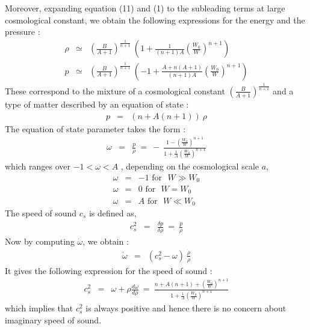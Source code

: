 \documentclass[a4paper,12pt,a4]{article}
\begin{document}
Moreover, expanding equation (11) and (1) to the subleading terms at large 
cosmological constant, we obtain the following expressions for the energy 
and the pressure : 
\begin{eqnarray}
\rho & \simeq & \left( {\frac{B}{A+1}} \right)^{\frac{1}{n+1}}~
\left( 1 + \frac{1}{ ( n+1) A} 
\left( \frac{W_0}{W} \right)^{n+1} \right) \nonumber \\
p & \simeq & \left( {\frac{B}{A+1}} \right)^{\frac{1}{n+1}}~ 
\left( - 1 + \frac{A + n (A + 1)}{( n+1) A} 
\left( \frac{W_0}{W} \right)^{n+1} \right)  
\end{eqnarray} 
These correspond to the mixture of a cosmological constant 
$\left( \frac{B}{A+1} \right)^{\frac{1}{n+1}}$ and a type of matter 
described by an equation of state : 
\begin{eqnarray}
p & = & \left( n + A (n + 1) \right)~ \rho 
\end{eqnarray}  
The equation of state parameter takes the form :
\begin{eqnarray}
\omega & = & \frac{p}{\rho}~=~ -~ 
\frac{1 - \left( \frac{W_0}{W} \right)^{n+1}}{1 + \frac{1}{A} 
\left( \frac{W_0}{W} \right)^{n+1}} 
\end{eqnarray}
which ranges over $-1 < \omega < A$ , depending on the cosmological scale 
$a$, 
\begin{eqnarray}
\omega & = & - 1 \mbox{ for}~~~W \gg W_0   \nonumber \\
\omega & = & 0  \mbox{ for}~~~W = W_0 \nonumber \\
\omega & = & A \mbox{ for}~~~W \ll W_0 
\end{eqnarray}
The speed of sound $c_s$ is defined as, 
\begin{eqnarray} 
c_s^2 & = & \frac{\delta p}{\delta \rho}~=~ \frac{\dot{p}}{\dot{\rho}} 
\end{eqnarray} 
Now by computing $\dot{\omega}$, we obtain : 
\begin{eqnarray} 
\dot{\omega} & = & \left( c_s^2 - \omega \right)~ \frac{\dot{\rho}}{\rho}  
\end{eqnarray} 
It gives the following expression for the speed of sound :   
\begin{eqnarray} 
c_s^2 & = & \omega + \rho \frac{d \omega}{d \rho} ~ = ~ 
\frac{n + A (n +1) + \left( \frac{W_0}{W} \right)^{n+1}}{1 + \frac{1}{A} 
\left( \frac{W_0}{W} \right)^{n+1}} 
\end{eqnarray} 
which implies that $c_s^2$ is always positive and hence there is no concern 
about imaginary speed of sound. \\ 
\end{document}
